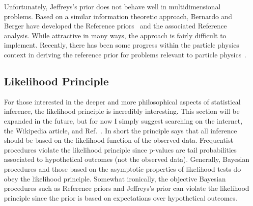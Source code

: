 Unfortunately, Jeffreys's prior does not behave well in multidimensional problems.  Based on a similar information theoretic approach, Bernardo and Berger have developed the Reference priors~\cite{Berger:1992ys,Berger:1992vn,Berger:1989kx,Bernardo:1979uq} and the associated Reference analysis.  While attractive in many ways, the approach is fairly difficult to implement.  Recently,  there has been some progress within the particle physics context in deriving the reference prior for problems relevant to particle physics~\cite{Demortier:2010sn,Casadei:2011hx}.


\subsection{Likelihood Principle}


For those interested in the deeper and more philosophical aspects of statistical inference, the likelihood principle is incredibly interesting.  This section will be expanded in the future, but for now I simply suggest searching on the internet, the Wikipedia article, and Ref.~\cite{Birnbaum:1962}.  In short the principle says that all inference should be based on the likelihood function of the observed data.  Frequentist procedures violate the likelihood principle since p-values are tail probabilities associated to hypothetical outcomes (not the observed data).  Generally, Bayesian procedures and those based on the asymptotic properties of likelihood tests do obey the likelihood principle.  Somewhat ironically, the objective Bayesian procedures such as Reference priors and Jeffreys's prior can violate the likelihood principle since the prior is based on expectations over hypothetical outcomes.
